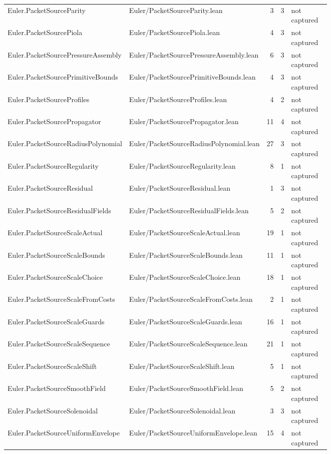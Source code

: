 \documentclass[10pt]{article}
\begin{document}
\begin{longtable}{p{0.28\linewidth}p{0.27\linewidth}r r p{0.20\linewidth}}
Euler.PacketSourceParity & Euler/PacketSourceParity.lean & 3 & 3 & not captured\\
Euler.PacketSourcePiola & Euler/PacketSourcePiola.lean & 4 & 3 & not captured\\
Euler.PacketSourcePressureAssembly & Euler/PacketSourcePressureAssembly.lean & 6 & 3 & not captured\\
Euler.PacketSourcePrimitiveBounds & Euler/PacketSourcePrimitiveBounds.lean & 4 & 3 & not captured\\
Euler.PacketSourceProfiles & Euler/PacketSourceProfiles.lean & 4 & 2 & not captured\\
Euler.PacketSourcePropagator & Euler/PacketSourcePropagator.lean & 11 & 4 & not captured\\
Euler.PacketSourceRadiusPolynomial & Euler/PacketSourceRadiusPolynomial.lean & 27 & 3 & not captured\\
Euler.PacketSourceRegularity & Euler/PacketSourceRegularity.lean & 8 & 1 & not captured\\
Euler.PacketSourceResidual & Euler/PacketSourceResidual.lean & 1 & 3 & not captured\\
Euler.PacketSourceResidualFields & Euler/PacketSourceResidualFields.lean & 5 & 2 & not captured\\
Euler.PacketSourceScaleActual & Euler/PacketSourceScaleActual.lean & 19 & 1 & not captured\\
Euler.PacketSourceScaleBounds & Euler/PacketSourceScaleBounds.lean & 11 & 1 & not captured\\
Euler.PacketSourceScaleChoice & Euler/PacketSourceScaleChoice.lean & 18 & 1 & not captured\\
Euler.PacketSourceScaleFromCosts & Euler/PacketSourceScaleFromCosts.lean & 2 & 1 & not captured\\
Euler.PacketSourceScaleGuards & Euler/PacketSourceScaleGuards.lean & 16 & 1 & not captured\\
Euler.PacketSourceScaleSequence & Euler/PacketSourceScaleSequence.lean & 21 & 1 & not captured\\
Euler.PacketSourceScaleShift & Euler/PacketSourceScaleShift.lean & 5 & 1 & not captured\\
Euler.PacketSourceSmoothField & Euler/PacketSourceSmoothField.lean & 5 & 2 & not captured\\
Euler.PacketSourceSolenoidal & Euler/PacketSourceSolenoidal.lean & 3 & 3 & not captured\\
Euler.PacketSourceUniformEnvelope & Euler/PacketSourceUniformEnvelope.lean & 15 & 4 & not captured\\

\end{longtable}
\end{document}

